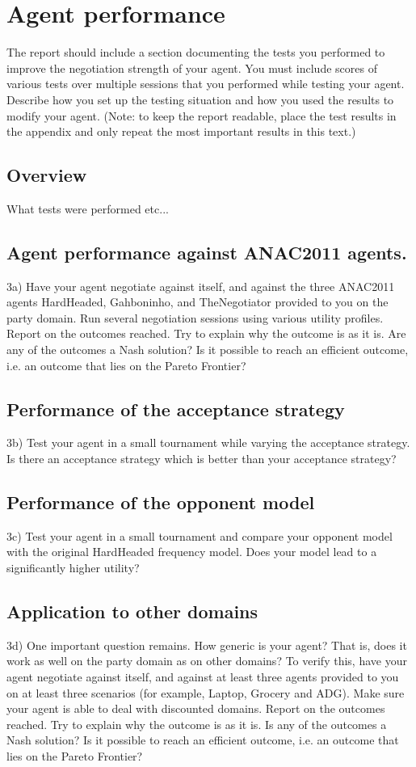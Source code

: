 \chapter{Agent performance}

The report should include a section documenting the tests you performed to improve the negotiation strength of your agent. You must include scores of various tests over multiple sessions that you performed while testing your agent. Describe how you set up the testing situation and how you used the results to modify your agent.
(Note: to keep the report readable, place the test results in the appendix and only repeat the most important results in this text.)

\section{Overview}
What tests were performed etc...

\section{Agent performance against ANAC2011 agents.}
3a) Have your agent negotiate against itself, and against the three ANAC2011 agents HardHeaded,
Gahboninho, and TheNegotiator provided to you on the party domain. Run several negotiation
sessions using various utility profiles. Report on the outcomes reached. Try to explain why the
outcome is as it is. Are any of the outcomes a Nash solution? Is it possible to reach an efficient
outcome, i.e. an outcome that lies on the Pareto Frontier?

\section{Performance of the acceptance strategy}
3b) Test your agent in a small tournament while varying the acceptance strategy. Is there an acceptance
strategy which is better than your acceptance strategy?

\section{Performance of the opponent model}
3c) Test your agent in a small tournament and compare your opponent model with the original
HardHeaded frequency model. Does your model lead to a significantly higher utility?

\section{Application to other domains}
3d) One important question remains. How generic is your agent? That is, does it work as well
on the party domain as on other domains? To verify this, have your agent negotiate against
itself, and against at least three agents provided to you on at least three scenarios (for example,
Laptop, Grocery and ADG). Make sure your agent is able to deal with discounted domains.
Report on the outcomes reached. Try to explain why the outcome is as it is. Is any of the
outcomes a Nash solution? Is it possible to reach an efficient outcome, i.e. an outcome that lies
on the Pareto Frontier?
